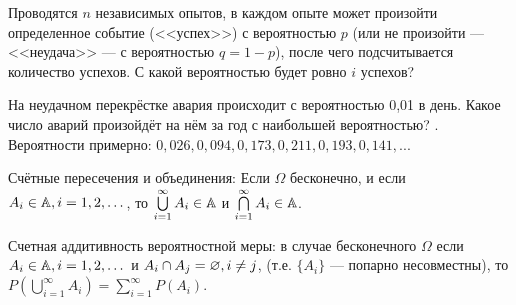 \documentclass[a4paper,11pt]{article}
\begin{document}
Проводятся $n$ независимых опытов, в каждом опыте может произойти определенное событие (<<успех>>) с вероятностью $p$ (или не произойти --- <<неудача>> --- с вероятностью $q=1-p$), после чего подсчитывается количество успехов.
С какой вероятностью будет ровно $i$ успехов?














На неудачном перекрёстке авария происходит с вероятностью 0{,}01 в день.
Какое число аварий произойдёт на нём за год с наибольшей вероятностью?
.
Вероятности примерно: $0{,}026, 0{,}094, 0{,}173, 0{,}211, 0{,}193, 0{,}141, ...$

















Счётные пересечения и объединения:
Если $\Omega$ бесконечно, и если $A_i \in \mathbb{A}, i=1,2,\dots $, то $\bigcup\limits_{i=1}^{\infty} A_i \in \mathbb{A} $  и $\bigcap\limits_{i=1}^{\infty} A_i \in \mathbb{A} $.

Счетная аддитивность вероятностной меры:
в случае бесконечного $\Omega$ если $A_i \in \mathbb{A}, i=1,2,\dots $ и $A_i\cap A_j=\varnothing,i\ne j$,
(т.е.  $\{A_i\}$ --- попарно несовместны), то $P(\bigcup\limits_{i=1}^{\infty}A_i)=\sum\limits_{i=1}^{\infty}P(A_i)$.
\end{document}
